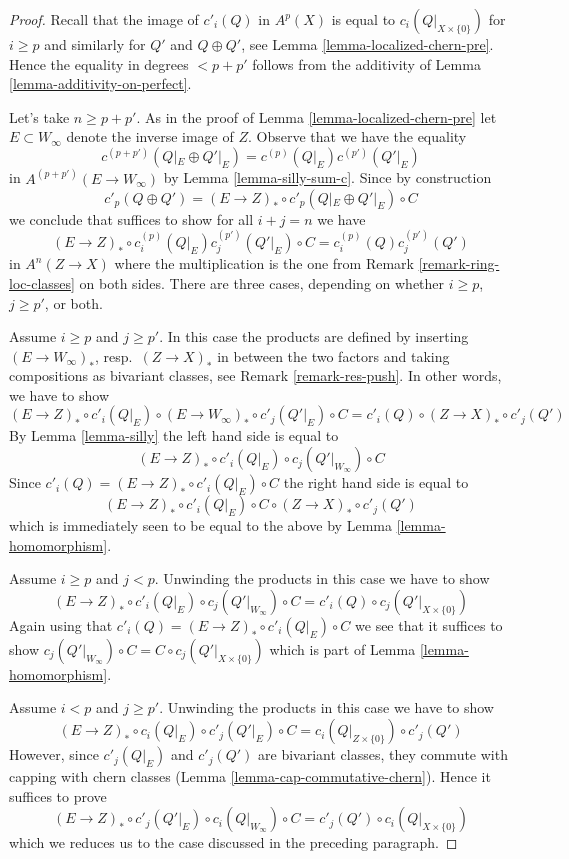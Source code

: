 \begin{proof}
Recall that the image of $c'_i(Q)$ in $A^p(X)$ is equal to
$c_i(Q|_{X \times \{0\}})$ for $i \geq p$ and similarly for
$Q'$ and $Q \oplus Q'$, see Lemma \ref{lemma-localized-chern-pre}.
Hence the equality in degrees $< p + p'$ follows from the
additivity of Lemma \ref{lemma-additivity-on-perfect}.

\medskip\noindent
Let's take $n \geq p + p'$.
As in the proof of Lemma \ref{lemma-localized-chern-pre}
let $E \subset W_\infty$ denote the inverse image of $Z$.
Observe that we have the equality
$$
c^{(p + p')}(Q|_E \oplus Q'|_E) =
c^{(p)}(Q|_E)c^{(p')}(Q'|_E)
$$
in $A^{(p + p')}(E \to W_\infty)$ by Lemma \ref{lemma-silly-sum-c}.
Since by construction
$$
c'_p(Q \oplus Q') = (E \to Z)_* \circ c'_p(Q|_E \oplus Q'|_E) \circ C
$$
we conclude that suffices to show for all $i + j = n$ we have
$$
(E \to Z)_* \circ c^{(p)}_i(Q|_E)c^{(p')}_j(Q'|_E) \circ C
=
c^{(p)}_i(Q)c^{(p')}_j(Q')
$$
in $A^n(Z \to X)$ where the multiplication is the one from
Remark \ref{remark-ring-loc-classes} on both sides. There are
three cases, depending on whether $i \geq p$, $j \geq p'$, or both.

\medskip\noindent
Assume $i \geq p$ and $j \geq p'$. In this case the products are
defined by inserting $(E \to W_\infty)_*$, resp.\ $(Z \to X)_*$ in between
the two factors and taking compositions as bivariant classes, see
Remark \ref{remark-res-push}.
In other words, we have to show
$$
(E \to Z)_* \circ c'_i(Q|_E) \circ
(E \to W_\infty)_* \circ c'_j(Q'|_E) \circ C =
c'_i(Q) \circ (Z \to X)_* \circ c'_j(Q')
$$
By Lemma \ref{lemma-silly} the left hand side is equal to
$$
(E \to Z)_* \circ c'_i(Q|_E) \circ c_j(Q'|_{W_\infty}) \circ C
$$
Since $c'_i(Q) = (E \to Z)_* \circ c'_i(Q|_E) \circ C$
the right hand side is equal to
$$
(E \to Z)_* \circ c'_i(Q|_E) \circ C \circ (Z \to X)_* \circ c'_j(Q')
$$
which is immediately seen to be equal to the above
by Lemma \ref{lemma-homomorphism}.

\medskip\noindent
Assume $i \geq p$ and $j < p$. Unwinding the products
in this case we have to show
$$
(E \to Z)_* \circ c'_i(Q|_E) \circ c_j(Q'|_{W_\infty}) \circ C =
c'_i(Q) \circ c_j(Q'|_{X \times \{0\}})
$$
Again using that $c'_i(Q) = (E \to Z)_* \circ c'_i(Q|_E) \circ C$
we see that it suffices to show $c_j(Q'|_{W_\infty}) \circ C =
C \circ c_j(Q'|_{X \times \{0\}})$ which is part of
Lemma \ref{lemma-homomorphism}.

\medskip\noindent
Assume $i < p$ and $j \geq p'$. Unwinding the products
in this case we have to show
$$
(E \to Z)_* \circ c_i(Q|_E) \circ c'_j(Q'|_E) \circ C =
c_i(Q|_{Z \times \{0\}}) \circ c'_j(Q')
$$
However, since $c'_j(Q|_E)$ and $c'_j(Q')$ are
bivariant classes, they commute with capping with chern classes
(Lemma \ref{lemma-cap-commutative-chern}). Hence it suffices to prove
$$
(E \to Z)_* \circ c'_j(Q'|_E) \circ c_i(Q|_{W_\infty}) \circ C =
c'_j(Q') \circ c_i(Q|_{X \times \{0\}})
$$
which we reduces us to the case discussed in the preceding paragraph.
\end{proof}

